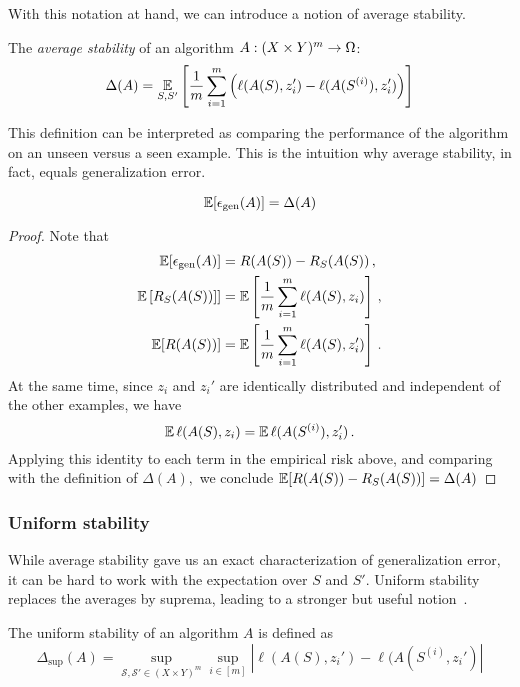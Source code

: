 With this notation at hand, we can introduce a notion of average stability.
\begin{definition} 
The \emph{average stability} of an algorithm $A: (X \times Y)^{m} \rightarrow \Omega$:
$$\Delta(A) = \operatorname*{\mathbb{E}}_{S,
S^{\prime}}\left[\frac{1}{m}\sum_{i=1}^{m}\left(\ell(A(S),z_i^{\prime}) -
\ell(A(S^{(i)}),z_{i}^{\prime})\right)\right]$$
\end{definition}
This definition can be interpreted as comparing the performance of the algorithm 
on an unseen versus a seen example. This is the intuition why average stability,
in fact, equals generalization error.
\begin{theorem}
$$\operatorname*{\mathbb{E}}[\epsilon_{\text{gen}}(A)] = \Delta(A)$$
\end{theorem}
\begin{proof}
Note that
\begin{align*}
\operatorname*{\mathbb{E}}[\epsilon_{\text{gen}}(A)] &= R(A(S)) - R_{S}(A(S))\,, \\
\operatorname*{\mathbb{E}}\left[R_{S}(A(S))\right]] &=
\operatorname*{\mathbb{E}}\left[\frac{1}{m}\sum_{i=1}^{m}\ell(A(S),z_i)\right]\,,\\
\operatorname*{\mathbb{E}} [R(A(S))]&=
\operatorname*{\mathbb{E}}\left[\frac{1}{m}\sum_{i=1}^{m}\ell(A(S),z_i^{\prime})\right]\,.
\end{align*}
At the same time, since $z_i$ and $z_i'$ are identically distributed and
independent of the other examples, we have
\[
\operatorname*{\mathbb{E}}\ell(A(S),z_i) = \operatorname*{\mathbb{E}}\ell(A(S^{(i)}),z_i^{\prime})\,.
\]
Applying this identity to each term in the empirical risk above, and comparing
with the definition of $\Delta(A),$ we conclude
$\operatorname*{\mathbb{E}}[R(A(S)) - R_S(A(S))] = \Delta(A)$
\end{proof}

\subsubsection{Uniform stability}
%
While average stability gave us an exact characterization of generalization
error, it can be hard to work with the expectation over $S$ and $S'.$ Uniform
stability replaces the averages by suprema, leading to a stronger but useful
notion~\cite{BousquettE02}.
%
\begin{definition}
The uniform stability of an algorithm $A$ is defined as 
\begin{equation*}
\Delta_{\sup}(A) = \sup_{\mathcal{S}, \mathcal{S}' \in (X\times Y)^m } 
\sup_{i \in [m]} |\ell(A(S), z_i') - \ell(A(S^{(i)}, z_i')|
\end{equation*}
\end{definition}

